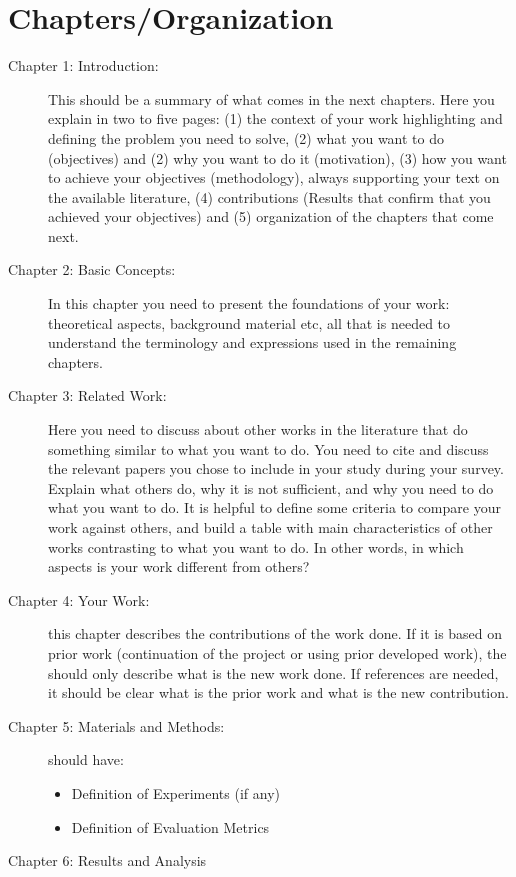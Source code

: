 {\section{Chapters/Organization}
\begin{description}
   \item[Chapter 1: Introduction:]
This should be a summary of what comes in the next chapters. Here you explain in two to five
pages: (1) the context of your work highlighting and defining the problem you need to solve, (2)
what you want to do (objectives) and (2) why you want to do it (motivation), (3) how you want to
achieve your objectives (methodology), always supporting your text on the available literature, (4)
contributions (Results that confirm that you achieved your objectives) and (5) organization of the
chapters that come next.
\item[Chapter 2: Basic Concepts:]
In this chapter you need to present the foundations of your work: theoretical aspects, background
material etc, all that is needed to understand the terminology and expressions used in the remaining
chapters.
\item[Chapter 3: Related Work:]
Here you need to discuss about other works in the literature that do something similar to what
you want to do. You need to cite and discuss the relevant papers you chose to include in your study
during your survey. Explain what others do, why it is not sufficient, and why you need to do what
you want to do. It is helpful to define some criteria to compare your work against others, and
build a table with main characteristics of other works contrasting to what you want to do. In other
words, in which aspects is your work different from others?
\item[Chapter 4: Your Work:] this chapter describes the contributions of the work done. If it is based on prior work (continuation of the project or using prior developed work), the should only describe what is the new work done. If references are needed, it should be clear what is the prior work and what is the new contribution.
\item[Chapter 5: Materials and Methods:] should have:
   \begin{itemize}
      \item Definition of Experiments (if any)
      \item Definition of Evaluation Metrics
   \end{itemize}
\item[Chapter 6: Results and Analysis]

\end{description}}

